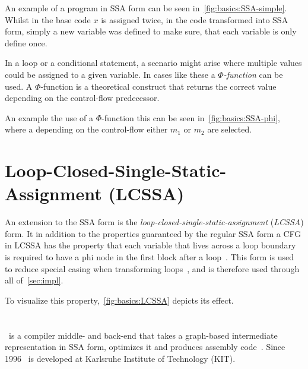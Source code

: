 An example of a program in SSA form can be seen in~\cref{fig:basics:SSA-simple}.
Whilst in the base code $x$ is assigned twice, in the code transformed into SSA form, simply a new variable was defined to make sure, that each variable is only define once.



In a loop or a conditional statement, a scenario might arise where multiple values could be assigned to a given variable.
In cases like these a \textit{$\Phi$-function} can be used.
A $\Phi$-function is a theoretical construct that returns the correct value depending on the control-flow predecessor.

An example the use of a $\Phi$-function this can be seen in~\cref{fig:basics:SSA-phi}, where a depending on the control-flow either $m_1$ or $m_2$ are selected.




\section{Loop-Closed-Single-Static-Assignment (LCSSA)}\label{sec:basics:LCSSA}

An extension to the SSA form is the \textit{loop-closed-single-static-assignment} (\textit{LCSSA}) form.
It in addition to the properties guaranteed by the regular SSA form a CFG in LCSSA has the property that each variable that lives across a loop boundary is required to have a phi node in the first block after a loop~\cite{LLVM_LCSSA}\cite{gcc_lcssa}.
This form is used to reduce special casing when transforming loops~\cite{aebi18bachelorarbeit}, and is therefore used through all of~\cref{sec:impl}.

To visualize this property,~\cref{fig:basics:LCSSA} depicts its effect.



\section{\libFIRM}\label{sec:basics:firm}

\libFIRM~is a compiler middle- and back-end that takes a graph-based intermediate representation in SSA form, optimizes it and produces assembly code~\cite{libfirm}.
Since 1996 \libFIRM~is developed at Karlsruhe Institute of Technology (KIT).


